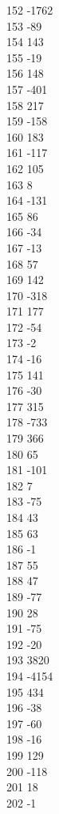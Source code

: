 { 152	-1762 \\
 153	-89 \\
 154	143 \\
 155	-19 \\
 156	148 \\
 157	-401 \\
 158	217 \\
 159	-158 \\
 160	183 \\
 161	-117 \\
 162	105 \\
 163	8 \\
 164	-131 \\
 165	86 \\
 166	-34 \\
 167	-13 \\
 168	57 \\
 169	142 \\
 170	-318 \\
 171	177 \\
 172	-54 \\
 173	-2 \\
 174	-16 \\
 175	141 \\
 176	-30 \\
 177	315 \\
 178	-733 \\
 179	366 \\
 180	65 \\
 181	-101 \\
 182	7 \\
 183	-75 \\
 184	43 \\
 185	63 \\
 186	-1 \\
 187	55 \\
 188	47 \\
 189	-77 \\
 190	28 \\
 191	-75 \\
 192	-20 \\
 193	3820 \\
 194	-4154 \\
 195	434 \\
 196	-38 \\
 197	-60 \\
 198	-16 \\
 199	129 \\
 200	-118 \\
 201	18 \\
 202	-1 \\
}
